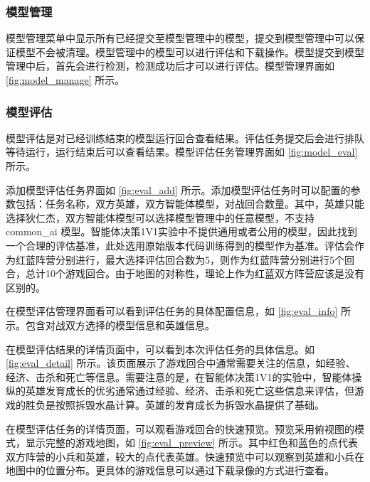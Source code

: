 \subsubsection{模型管理}

模型管理菜单中显示所有已经提交至模型管理中的模型，提交到模型管理中可以保证模型不会被清理。模型管理中的模型可以进行评估和下载操作。模型提交到模型管理中后，首先会进行检测，检测成功后才可以进行评估。模型管理界面如 \cref{fig:model_manage} 所示。

\subsubsection{模型评估}


模型评估是对已经训练结束的模型运行回合查看结果。评估任务提交后会进行排队等待运行，运行结束后可以查看结果。模型评估任务管理界面如 \cref{fig:model_eval} 所示。


添加模型评估任务界面如 \cref{fig:eval_add} 所示。添加模型评估任务时可以配置的参数包括：任务名称，双方英雄，双方智能体模型，对战回合数量。其中，英雄只能选择狄仁杰，双方智能体模型可以选择模型管理中的任意模型，不支持 common\_ai 模型。智能体决策1V1实验中不提供通用或者公用的模型，因此找到一个合理的评估基准，此处选用原始版本代码训练得到的模型作为基准。评估会作为红蓝阵营分别进行，最大选择评估回合数为5，则作为红蓝阵营分别进行5个回合，总计10个游戏回合。由于地图的对称性，理论上作为红蓝双方阵营应该是没有区别的。

在模型评估管理界面看可以看到评估任务的具体配置信息，如 \cref{fig:eval_info} 所示。包含对战双方选择的模型信息和英雄信息。

在模型评估结果的详情页面中，可以看到本次评估任务的具体信息。如 \cref{fig:eval_detail} 所示。该页面展示了游戏回合中通常需要关注的信息，如经验、经济、击杀和死亡等信息。需要注意的是，在智能体决策1V1的实验中，智能体操纵的英雄发育成长的优劣通常通过经验、经济、击杀和死亡这些信息来评估，但游戏的胜负是按照拆毁水晶计算。英雄的发育成长为拆毁水晶提供了基础。

在模型评估任务的详情页面，可以观看游戏回合的快速预览。预览采用俯视图的模式，显示完整的游戏地图，如 \cref{fig:eval_preview} 所示。其中红色和蓝色的点代表双方阵营的小兵和英雄，较大的点代表英雄。快速预览中可以观察到英雄和小兵在地图中的位置分布。更具体的游戏信息可以通过下载录像的方式进行查看。

